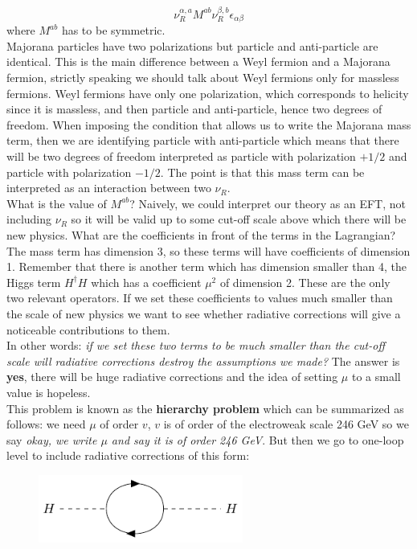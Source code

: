 \documentclass[../main.tex]{subfiles}
\begin{document}
\[
\nu_R^{\alpha,a}M^{ab}\nu_R^{\beta,b}\epsilon_{\alpha\beta}
\]
where $M^{ab}$ has to be symmetric.\\
Majorana particles have two polarizations but particle and anti-particle are identical. This is the main difference between a Weyl fermion and a Majorana fermion, strictly speaking we should talk about Weyl fermions only for massless fermions. Weyl fermions have only one polarization, which corresponds to helicity since it is massless, and then particle and anti-particle, hence two degrees of freedom. When imposing the condition that allows us to write the Majorana mass term, then we are identifying particle with anti-particle which means that there will be two degrees of freedom interpreted as particle with polarization $+1/2$ and particle with polarization $-1/2$. The point is that this mass term can be interpreted as an interaction between two $\nu_R$.\\
What is the value of $M^{ab}$? Naively, we could interpret our theory as an EFT, not including $\nu_R$ so it will be valid up to some cut-off scale above which there will be new physics. What are the coefficients in front of the terms in the Lagrangian? The mass term has dimension 3, so these terms will have coefficients of dimension 1. Remember that there is another term which has dimension smaller than 4, the Higgs term $H^\dagger H$ which has a coefficient $\mu^2$ of dimension 2. These are the only two relevant operators. If we set these coefficients to values much smaller than the scale of new physics we want to see whether radiative corrections will give a noticeable contributions to them.\\
In other words: \textit{if we set these two terms to be much smaller than the cut-off scale will radiative corrections destroy the assumptions we made?} The answer is \textbf{yes}, there will be huge radiative corrections and the idea of setting $\mu$ to a small value is hopeless.\\
This problem is known as the \textbf{hierarchy problem} which can be summarized as follows: we need $\mu$ of order $v$, $v$ is of order of the electroweak scale 246 GeV so we say \textit{okay, we write $\mu$ and say it is of order 246 GeV}. But then we go to one-loop level to include radiative corrections of this form:\\
\begin{figure}[h]
    \centering
    \includegraphics[width=0.6\textwidth]{Images/higgscorrections.pdf}
    \caption*{}
\end{figure}\\
\end{document}
